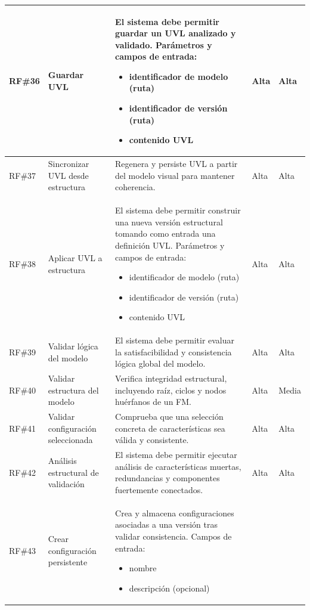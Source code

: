 \begin{longtable}{|p{1cm}|p{4cm}|p{5.2cm}|p{1.9cm}|p{1.9cm}|}
	\hline
	\ac{RF}\#36 & Guardar \ac{UVL} & El sistema debe permitir guardar un \ac{UVL} analizado y validado. Parámetros y campos de entrada:
		\begin{itemize}
			\item identificador de modelo (ruta)
			\item identificador de versión (ruta)
			\item contenido \ac{UVL}
		\end{itemize}
	& Alta & Alta \\
	\hline
    \rowcolor[HTML]{EDEBF1}
	\ac{RF}\#37 & Sincronizar \ac{UVL} desde estructura & Regenera y persiste \ac{UVL} a partir del modelo visual para mantener coherencia. & Alta & Alta \\
	\hline
	\ac{RF}\#38 & Aplicar \ac{UVL} a estructura & El sistema debe permitir construir una nueva versión estructural tomando como entrada una definición \ac{UVL}. Parámetros y campos de entrada:
		\begin{itemize}
			\item identificador de modelo (ruta)
			\item identificador de versión (ruta)
			\item contenido \ac{UVL}
		\end{itemize}
	& Alta & Alta \\
	\hline
	\rowcolor[HTML]{EDEBF1}
	\ac{RF}\#39 & Validar lógica del modelo & El sistema debe permitir evaluar la satisfacibilidad y consistencia lógica global del modelo. & Alta & Alta \\
	\hline
	\ac{RF}\#40 & Validar estructura del modelo & Verifica integridad estructural, incluyendo raíz, ciclos y nodos huérfanos de un \ac{FM}. & Alta & Media \\
	\hline
	\rowcolor[HTML]{EDEBF1}
	\ac{RF}\#41 & Validar configuración seleccionada & Comprueba que una selección concreta de características sea válida y consistente. & Alta & Alta \\
	\hline
	\ac{RF}\#42 & Análisis estructural de validación & El sistema debe permitir ejecutar análisis de características muertas, redundancias y componentes fuertemente conectados. & Alta & Alta \\
	\hline
	\rowcolor[HTML]{EDEBF1}
	\ac{RF}\#43 & Crear configuración persistente & Crea y almacena configuraciones asociadas a una versión tras validar consistencia. Campos de entrada:
		\begin{itemize}
			\item nombre
			\item descripción (opcional)

\end{itemize}
\end{longtable}
